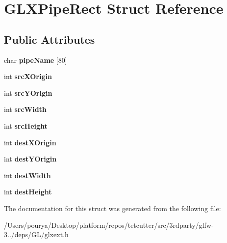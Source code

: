 \hypertarget{structGLXPipeRect}{}\section{G\+L\+X\+Pipe\+Rect Struct Reference}
\label{structGLXPipeRect}
\subsection*{Public Attributes}
\begin{DoxyCompactItemize}
\item 
\hypertarget{structGLXPipeRect_a88e732f4d56b659b0366aabd6bc362dc}{}char {\bfseries pipe\+Name} \mbox{[}80\mbox{]}\label{structGLXPipeRect_a88e732f4d56b659b0366aabd6bc362dc}

\item 
\hypertarget{structGLXPipeRect_a9df2313c01f75d149e64f2ff467bc266}{}int {\bfseries src\+X\+Origin}\label{structGLXPipeRect_a9df2313c01f75d149e64f2ff467bc266}

\item 
\hypertarget{structGLXPipeRect_a1f7316dff7050ab2ce9d3d37f8c5450e}{}int {\bfseries src\+Y\+Origin}\label{structGLXPipeRect_a1f7316dff7050ab2ce9d3d37f8c5450e}

\item 
\hypertarget{structGLXPipeRect_a2c6c180a4dabb71076366e06a1c7d0ef}{}int {\bfseries src\+Width}\label{structGLXPipeRect_a2c6c180a4dabb71076366e06a1c7d0ef}

\item 
\hypertarget{structGLXPipeRect_a35632524bce6bffa05f284a9b1c1b8ff}{}int {\bfseries src\+Height}\label{structGLXPipeRect_a35632524bce6bffa05f284a9b1c1b8ff}

\item 
\hypertarget{structGLXPipeRect_a8b7b941894ad3420326d7e9fa885bb71}{}int {\bfseries dest\+X\+Origin}\label{structGLXPipeRect_a8b7b941894ad3420326d7e9fa885bb71}

\item 
\hypertarget{structGLXPipeRect_aef7766b02ef07c20a11e89da5878b469}{}int {\bfseries dest\+Y\+Origin}\label{structGLXPipeRect_aef7766b02ef07c20a11e89da5878b469}

\item 
\hypertarget{structGLXPipeRect_a3c07991d2a8fb6e973eae834650b3dad}{}int {\bfseries dest\+Width}\label{structGLXPipeRect_a3c07991d2a8fb6e973eae834650b3dad}

\item 
\hypertarget{structGLXPipeRect_a858b0ea6642e451495aff35cfefbd083}{}int {\bfseries dest\+Height}\label{structGLXPipeRect_a858b0ea6642e451495aff35cfefbd083}

\end{DoxyCompactItemize}


The documentation for this struct was generated from the following file\+:\begin{DoxyCompactItemize}
\item 
/\+Users/pourya/\+Desktop/platform/repos/tetcutter/src/3rdparty/glfw-\/3../deps/\+G\+L/glxext.\+h\end{DoxyCompactItemize}
